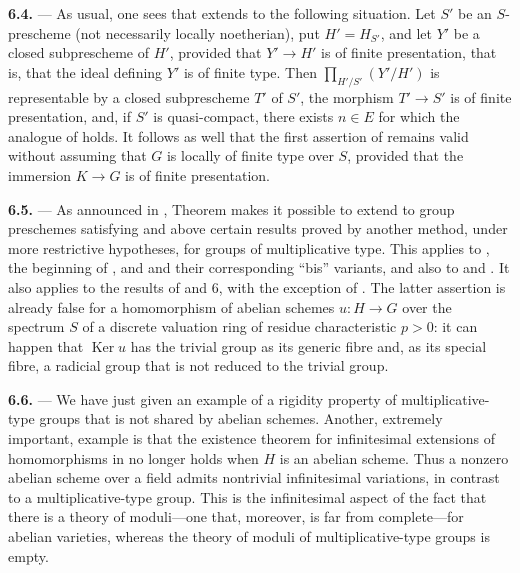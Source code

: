 \medskip
\noindent{}\textbf{6.4.} ---
As usual, one sees that 
extends to the following situation.  Let \(S'\) be an \(S\)-prescheme
(not necessarily locally noetherian), put \(H'=H_{S'}\), and let
\(Y'\) be a closed subprescheme of \(H'\), provided that
\(Y'\to H'\) is of finite presentation, that is, that the ideal
defining \(Y'\) is of finite type.  Then
\(\prod_{H'/S'}(Y'/H')\) is representable by a closed subprescheme
\(T'\) of \(S'\), the morphism \(T'\to S'\) is of finite
presentation, and, if \(S'\) is quasi-compact, there exists \(n\in E\)
for which the analogue of  holds.  It follows as well
that the first assertion of 
remains valid without assuming that \(G\) is locally of finite type
over \(S\), provided that the immersion \(K\to G\) is of finite
presentation.

\medskip
\noindent{}\textbf{6.5.} ---
As announced in , Theorem
 makes it possible to extend to
group preschemes satisfying  and  above certain results
proved by another method, under more restrictive hypotheses, for
groups of multiplicative type.  This applies to , the beginning
of , and  and their corresponding ``bis'' variants, and also
to  and .  It also applies to the results of
 and 6, with the exception of .
The latter assertion is already false for a homomorphism of abelian
schemes \(u:H\to G\) over the spectrum \(S\) of a discrete valuation
ring of residue characteristic \(p>0\): it can happen that
\(\operatorname{Ker}u\) has the trivial group as its generic fibre
and, as its special fibre, a radicial group that is not reduced to
the trivial group.

\medskip
\noindent{}\textbf{6.6.} ---
We have just given an example of a rigidity property of
multiplicative-type groups that is not shared by abelian schemes.
Another, extremely important, example is that the existence theorem
for infinitesimal extensions of homomorphisms in  no
longer holds when \(H\) is an abelian scheme.  Thus a nonzero abelian
scheme over a field admits nontrivial infinitesimal variations, in
contrast to a multiplicative-type group.  This is the infinitesimal
aspect of the fact that there is a theory of moduli---one that,
moreover, is far from complete---for abelian varieties, whereas the
theory of moduli of multiplicative-type groups is empty.

